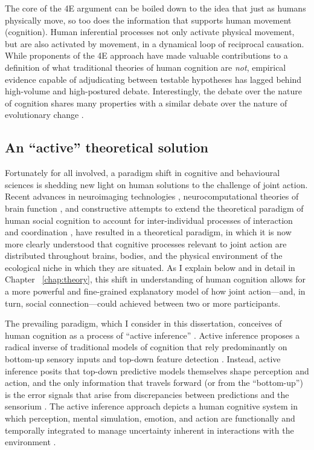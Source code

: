 \begin{CJK}{UTF8}{gbsn}
The core of the 4E argument can be boiled down to the idea that just as humans physically move, so too does the information that supports human movement (cognition).  Human inferential processes not only activate physical movement, but are also activated by movement, in a dynamical loop of reciprocal causation.  While proponents of the 4E approach have made valuable contributions to a definition of what traditional theories of human cognition are \textit{not}, empirical evidence capable of adjudicating between testable hypotheses has lagged behind high-volume and high-postured debate.  Interestingly, the debate over the nature of cognition shares many properties with a similar debate over the nature of evolutionary change \citep{Nowak2010,Scott-Phillips2011,Laland2014,Fuentes2016}.

\subsection{An ``active'' theoretical solution}
Fortunately for all involved, a paradigm shift in cognitive and behavioural sciences is shedding new light on human solutions to the challenge of joint action.  Recent advances in neuroimaging technologies \citep{Frith2007}, neurocomputational theories of brain function \citep{Friston2010,Frith2010,Yufik2013,Clark2013}, and constructive attempts to extend the theoretical paradigm of human social cognition to account for inter-individual processes of interaction and coordination \citep{Sebanz2006,Dale2014}, have resulted in a theoretical paradigm, in which it is now more clearly understood that cognitive processes relevant to joint action are distributed throughout brains, bodies, and the physical environment of the ecological niche in which they are situated.  As I explain below and in detail in Chapter ~\ref{chap:theory}, this shift in understanding of human cognition allows for a more powerful and fine-grained explanatory model of how joint action---and, in turn, social connection---could achieved between two or more participants.

The prevailing paradigm, which I consider in this dissertation, conceives of human cognition as a process of ``active inference'' \citep{Friston2010}.  Active inference \citep[and the predictive coding paradigm which it extends, see][]{Clark2013} proposes a radical inverse of traditional models of cognition that rely predominantly on bottom-up sensory inputs and top-down feature detection \citep{Marr1985}. Instead, active inference posits that top-down predictive models themselves shape perception and action, and the only information that travels forward (or from the ``bottom-up'') is the error signals that arise from discrepancies between predictions and the sensorium \citep{Clark2015}.  The active inference approach  depicts a human cognitive system in which perception, mental simulation, emotion, and action are functionally and temporally integrated to manage uncertainty inherent in interactions with the environment \citep{Clark2013}.


\end{CJK}
